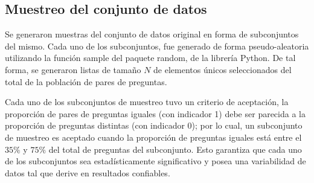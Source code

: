 \subsection{Muestreo del conjunto de datos}

Se generaron muestras del conjunto de datos original en forma de subconjuntos del mismo. Cada uno de los subconjuntos, fue generado de forma pseudo-aleatoria utilizando la función sample del paquete random, de la librería Python. De tal forma, se generaron listas de tamaño \(N\) de elementos únicos seleccionados del total de la población de pares de preguntas.

\bigskip Cada uno de los subconjuntos de muestreo tuvo un criterio de aceptación, la proporción de pares de preguntas iguales (con indicador 1) debe ser parecida a la proporción de preguntas distintas (con indicador 0); por lo cual, un subconjunto de muestreo es aceptado cuando la proporción de preguntas iguales está entre el \(35\%\) y \(75\%\) del total de preguntas del subconjunto. Esto garantiza que cada uno de los subconjuntos sea estadísticamente significativo y posea una variabilidad de datos tal que derive en resultados confiables.
